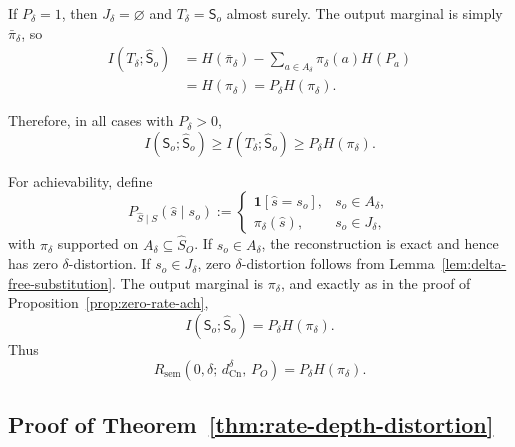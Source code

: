 \documentclass[journal,onecolumn]{IEEEtran}
\makeatletter
\newcommand{\Cn}{\text{Cn}}
\numberwithin{equation}{section}
\renewenvironment{proof}[1][\proofname]{\par
  \pushQED{\qed}%
  \normalfont \topsep6\p@\@plus6\p@\relax
  \trivlist
  \item[\hskip\labelsep
        \itshape
    #1\@addpunct{.}]\ignorespaces
}{%
  \popQED\endtrivlist\@endpefalse
}
\makeatother
\begin{document}
\begin{proof}
If \(P_\delta=1\), then \(J_\delta=\varnothing\) and
\(T_\delta={\mathsf{S}}_o\) almost surely. The output marginal is simply
\(\bar\pi_\delta\), so
\begin{align*}
  I(T_\delta;\hat {\mathsf{S}}_o)
  &=
  H(\bar\pi_\delta)-
  \sum_{a\in A_\delta}\pi_\delta(a)H(P_a) \\
  &=
  H(\pi_\delta)
  =
  P_\delta H(\pi_\delta).
\end{align*}

Therefore, in all cases with \(P_\delta>0\),
\[
  I({\mathsf{S}}_o;\hat {\mathsf{S}}_o)\ge I(T_\delta;\hat {\mathsf{S}}_o)\ge P_\delta H(\pi_\delta).
\]

For achievability, define
\[
  P_{\hat S\mid S}(\hat s\mid s_o)
  :=
  \begin{cases}
    \mathbf{1}[\hat s=s_o], & s_o\in A_\delta,\\[3pt]
    \pi_\delta(\hat s), & s_o\in J_\delta,
  \end{cases}
\]
with \(\pi_\delta\) supported on \(A_\delta\subseteq\hat S_O\).
If \(s_o\in A_\delta\), the reconstruction is exact and hence has
zero \(\delta\)-distortion.
If \(s_o\in J_\delta\), zero \(\delta\)-distortion follows from
Lemma~\ref{lem:delta-free-substitution}.
The output marginal is \(\pi_\delta\), and exactly as in the proof of
Proposition~\ref{prop:zero-rate-ach},
\[
  I({\mathsf{S}}_o;\hat {\mathsf{S}}_o)=P_\delta H(\pi_\delta).
\]
Thus
\[
  R_{\mathrm{sem}}(0,\delta;\,d_{\Cn}^{\delta},\,P_O)
  =
  P_\delta H(\pi_\delta).
\]
\end{proof}

\subsection{Proof of Theorem~\ref{thm:rate-depth-distortion}}
\label{app:proof-rate-depth-distortion}
\end{document}

